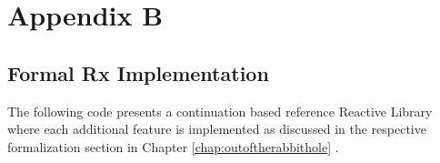 %
%

\chapter{Appendix B}
\label{app:b}

\section{Formal Rx Implementation}

The following code presents a continuation based reference Reactive Library where each additional feature is implemented as discussed in the respective formalization section in Chapter \ref{chap:outoftherabbithole} .

